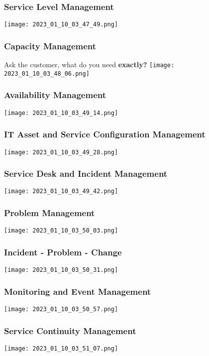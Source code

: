 \documentclass[main.tex,fontsize=12pt,paper=a4,paper=landscape,DIV=calc,]{scrartcl}
\begin{document}
\begin{multicols*}{2}
\subsubsection{Service Level Management}
\texttt{[image: 2023\_01\_10\_03\_47\_49.png]}

\subsubsection{Capacity Management}
Ask the customer, what do you need \textbf{exactly?}\newline
\texttt{[image: 2023\_01\_10\_03\_48\_06.png]}

\subsubsection{Availability Management}
\texttt{[image: 2023\_01\_10\_03\_49\_14.png]}

\subsubsection{IT Asset and Service Configuration Management}
\texttt{[image: 2023\_01\_10\_03\_49\_28.png]}

\subsubsection{Service Desk and Incident Management}
\texttt{[image: 2023\_01\_10\_03\_49\_42.png]}

\subsubsection{Problem Management}
\texttt{[image: 2023\_01\_10\_03\_50\_03.png]}

\subsubsection{Incident - Problem - Change}
\texttt{[image: 2023\_01\_10\_03\_50\_31.png]}

\subsubsection{Monitoring and Event Management}
\texttt{[image: 2023\_01\_10\_03\_50\_57.png]}

\subsubsection{Service Continuity Management}
\texttt{[image: 2023\_01\_10\_03\_51\_07.png]}


\end{multicols*}
\end{document}
